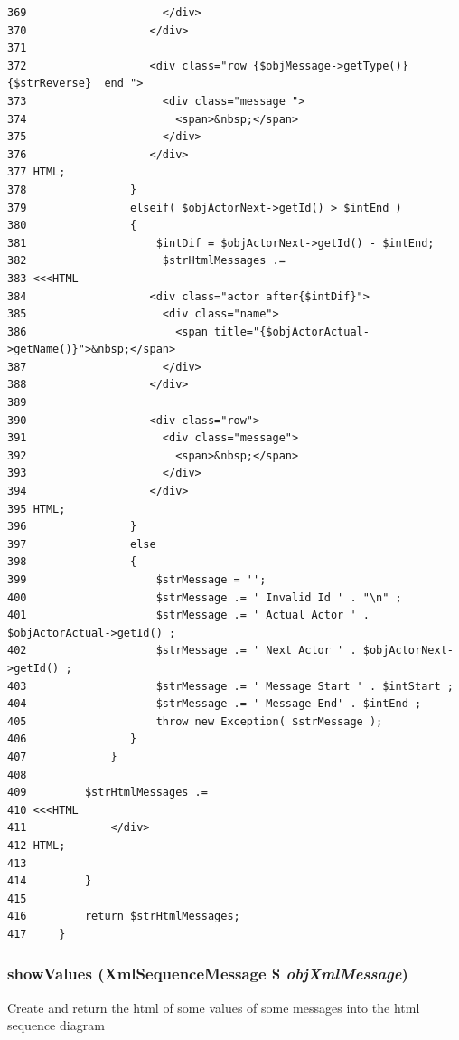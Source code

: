 \begin{Code}
\begin{verbatim}
369                     </div>
370                   </div>
371 
372                   <div class="row {$objMessage->getType()} {$strReverse}  end ">
373                     <div class="message ">
374                       <span>&nbsp;</span>
375                     </div>
376                   </div>
377 HTML;
378                }
379                elseif( $objActorNext->getId() > $intEnd )
380                {
381                    $intDif = $objActorNext->getId() - $intEnd;
382                     $strHtmlMessages .=
383 <<<HTML
384                   <div class="actor after{$intDif}">
385                     <div class="name">
386                       <span title="{$objActorActual->getName()}">&nbsp;</span>
387                     </div>
388                   </div>
389 
390                   <div class="row">
391                     <div class="message">
392                       <span>&nbsp;</span>
393                     </div>
394                   </div>
395 HTML;
396                }
397                else
398                {
399                    $strMessage = '';
400                    $strMessage .= ' Invalid Id ' . "\n" ;
401                    $strMessage .= ' Actual Actor ' . $objActorActual->getId() ;
402                    $strMessage .= ' Next Actor ' . $objActorNext->getId() ;
403                    $strMessage .= ' Message Start ' . $intStart ;
404                    $strMessage .= ' Message End' . $intEnd ;
405                    throw new Exception( $strMessage );
406                }
407             }
408 
409         $strHtmlMessages .=
410 <<<HTML
411             </div>
412 HTML;
413 
414         }
415 
416         return $strHtmlMessages;
417     }
\end{verbatim}
\end{Code}


\hypertarget{class_xml_sequence_printer_diagram_6562038bc417e04c0db2cd4b55403b06}{
\subsubsection[{showValues}]{\setlength{\rightskip}{0pt plus 5cm}showValues ({\bf XmlSequenceMessage} \$ {\em objXmlMessage})}}
\label{class_xml_sequence_printer_diagram_6562038bc417e04c0db2cd4b55403b06}


Create and return the html of some values of some messages into the html sequence diagram

